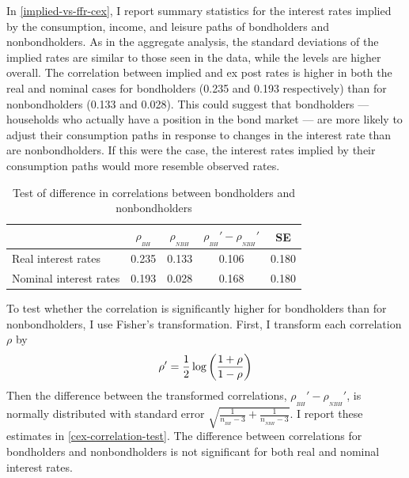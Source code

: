
In \autoref{implied-vs-ffr-cex}, I report summary statistics for the interest rates implied by the consumption, income, and leisure paths of bondholders and nonbondholders. As in the aggregate analysis, the standard deviations of the implied rates are similar to those seen in the data, while the levels are higher overall. The correlation between implied and ex post rates is higher in both the real and nominal cases for bondholders (0.235 and 0.193 respectively) than for nonbondholders (0.133 and 0.028). This could suggest that bondholders --- households who actually have a position in the bond market --- are more likely to adjust their consumption paths in response to changes in the interest rate than are nonbondholders. If this were the case, the interest rates implied by their consumption paths would more resemble observed rates.

\begin{table}[b]
\centering
\caption{Test of difference in correlations between bondholders and nonbondholders}
\label{cex-correlation-test}
\begin{tabular}{lcccc} \hline
& $\rho_{_{BH}}$ & $\rho_{_{NBH}}$ & $\rho_{_{BH}}' - \rho_{_{NBH}}'$ & SE \\ \hline
Real interest rates    & 0.235 & 0.133 & 0.106 & 0.180 \\
Nominal interest rates & 0.193 & 0.028 & 0.168 & 0.180 \\ \hline
\end{tabular}
\end{table}

To test whether the correlation is significantly higher for bondholders than for nonbondholders, I use Fisher's transformation. First, I transform each correlation $\rho$ by $$\rho' = \frac{1}{2} \log \left( \frac{1+\rho}{1-\rho} \right)$$
Then the difference between the transformed correlations, $\rho_{_{BH}}' - \rho_{_{NBH}}'$, is normally distributed with standard error $\sqrt{\frac{1}{n_{_{BH}} - 3} + \frac{1}{n_{_{NBH}} - 3}}$. I report these estimates in \autoref{cex-correlation-test}. The difference between correlations for bondholders and nonbondholders is not significant for both real and nominal interest rates.

